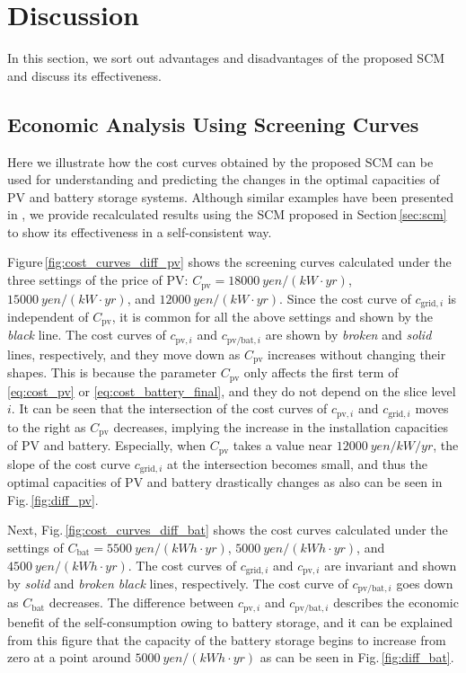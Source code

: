 \documentclass[lettersize,journal]{IEEEtran}
\newcommand{\figref}[1]{Fig.\,\ref{#1}}
\newcommand{\Figref}[1]{Figure\,\ref{#1}}
\newcommand{\secref}[1]{Section\,\ref{#1}}
\begin{document}
\section{Discussion} \label{sec:discussion}

In this section, we sort out advantages and disadvantages of the proposed SCM and discuss its effectiveness. 


\subsection{Economic Analysis Using Screening Curves}

%
Here we illustrate how the cost curves obtained by the proposed SCM can be used for understanding and predicting the changes in the optimal capacities of PV and battery storage systems. %
Although similar examples have been presented in \cite{hoshino21}, we provide recalculated results using the  SCM  proposed in \secref{sec:scm} to show its effectiveness in a self-consistent way. 

%
\Figref{fig:cost_curves_diff_pv} shows the screening curves calculated under the three settings of the price of PV: $C_\mathrm{pv} = \SI{18000}{yen/(kW\cdot yr)}$, $\SI{15000}{yen/(kW\cdot yr)}$, and $\SI{12000}{yen/(kW\cdot yr)}$. 
Since the cost curve of $c_{\mathrm{grid},i}$ is independent of $C_\mathrm{pv}$, it is common for all the above settings and shown by the \emph{black} line. 
The cost curves of $c_{\mathrm{pv},i}$ and $c_{\mathrm{pv/bat},i}$ are shown by \emph{broken} and \emph{solid} lines, respectively, and they move down as $C_\mathrm{pv}$ increases without changing their shapes. 
This is because the parameter $C_\mathrm{pv}$ only affects the first term of \eqref{eq:cost_pv} or  \eqref{eq:cost_battery_final}, and they do not depend on the slice level $i$. 
It can be seen that the intersection of the cost curves of $c_{\mathrm{pv},i}$ and $c_{\mathrm{grid},i}$ moves to the right as $C_\mathrm{pv}$ decreases, implying the increase in the installation capacities of PV and battery.   
Especially, when $C_\mathrm{pv}$ takes a value near $\SI{12000}{yen/kW/yr}$, the slope of the cost curve $c_{\mathrm{grid},i}$ at the intersection becomes small, and thus the optimal capacities of PV and battery drastically  changes as also can be seen in \figref{fig:diff_pv}. 


%
Next, \figref{fig:cost_curves_diff_bat} shows the cost curves calculated under the settings of $C_\mathrm{bat}= \SI{5500}{yen/(kWh\cdot yr)}$, $\SI{5000}{yen/(kWh \cdot yr)}$, and $\SI{4500}{yen/(kWh\cdot yr)}$. 
The cost curves of $c_{\mathrm{grid},i}$ and $c_{\mathrm{pv},i}$ are invariant and shown by \emph{solid} and \emph{broken black} lines, respectively. 
The cost curve of $c_{\mathrm{pv/bat},i}$ goes down as $C_\mathrm{bat}$ decreases. 
The difference between $c_{\mathrm{pv},i}$ and $c_{\mathrm{pv/bat},i}$ describes the economic benefit of the self-consumption owing to battery storage, and it can be explained from this figure that the capacity of the battery storage begins to increase from zero at a point around  $\SI{5000}{yen/(kWh\cdot yr)}$ as can be seen in \figref{fig:diff_bat}. 
\end{document}
